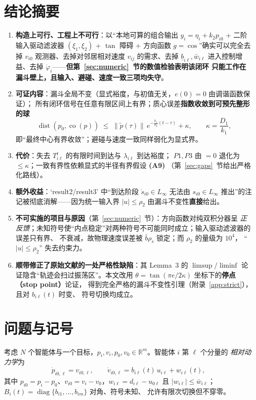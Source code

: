 \documentclass[11pt,a4paper]{article}
\newcommand{\ub}{\underline{b}}
\newcommand{\dist}{\operatorname{dist}}
\newcommand{\co}{\operatorname{co}}
\newcommand{\diag}{\operatorname{diag}}
\theoremstyle{plain}
\theoremstyle{definition}
\theoremstyle{remark}
\begin{document}
\section{结论摘要}
\begin{enumerate}[label=\textbf{\arabic*.}]
\item \textbf{构造上可行、工程上不可行}：以“本地可算的组合输出 $y_i=\eta_i+k_2p_{i0}$ +
二阶输入驱动滤波器 $(\xi_1,\xi_2)$ + $\tan$ 障碍 + 方向函数 $g=\cos$”确实可以完全去掉
$v_{i0}$ 观测器、去掉对邻居相对速度 $v_{ij}$ 的需求、去掉 $\ub_{i\ell},\bar w_{i\ell}$
进入控制增益、去掉 $\dot\varphi_i$——\textbf{但第~\ref{sec:numeric}~节的数值检验表明该闭环
只能工作在漏斗壁上，且输入、避碰、速度一致三项均失守}。
\item \textbf{可证内容}：漏斗全局不变（显式裕度，与初值无关，$e(0)=0$ 由调谐函数保证）；
所有闭环信号在任意有限区间上有界；质心误差\textbf{指数收敛到可预先整形的球}
\begin{equation*}
\dist(p_0,\co(p))\;\le\;\|\tilde p(\tau)\|\,e^{-\frac{k_1}{k_2}(t-\tau)}+\kappa,
\qquad \kappa=\frac{D_1}{k_1},
\end{equation*}
即“最终中心有界收敛”；避碰与速度一致同样弱化为显式界。
\item \textbf{代价}：失去 $T^{\mathrm r}_{i\ell}$ 的有限时间到达与 $\lambda_{i\ell}$ 到达裕度；
$P1,P3$ 由 $=0$ 退化为 $\le\kappa$；一致有界性依赖显式的半径有界假设 \textbf{(A9)}
（第~\ref{sec:gaps}~节给出严格化路线）。
\item \textbf{额外收益}：`result2/result3' 中“到达阶段 $\dot s_{i0}\in L_\infty$ 无法由
$s_{i0}\in L_\infty$ 推出”的注记被彻底消解——因为统一输入界
$|u|\le\rho_2$ 由漏斗不变性\textbf{直接}给出。
\item \textbf{不可实施的项目与原因}（第~\ref{sec:numeric}~节）：方向函数对纯双积分器呈
\emph{正反馈}；未知符号使“内点稳定”对两种符号不可能同时成立；输入驱动滤波器的误差只有界、
不衰减，故物理速度误差被 $\bar b\rho_s$ 锁定；而 $\rho_2$ 的量级为 $10^4$，
“$|u|\le\rho_2$” 失去约束力。
\item \textbf{顺带修正了原始文献的一处严格性缺陷}：其 Lemma~3 的
$\limsup/\liminf$ 论证隐含“轨迹会扫过振荡区”。本文改用
$\theta=\tan(\pi e/2\kappa)$ 坐标下的\textbf{停点（stop point）}论证，
得到完全严格的漏斗不变性引理（附录~\ref{app:strict}），且对 $b_{i\ell}(t)$ 时变、
符号切换均成立。
\end{enumerate}

\section{问题与记号}
考虑 $N$ 个智能体与一个目标，$p_i,v_i,p_0,v_0\in\mathbb R^m$。智能体 $i$ 第 $\ell$ 个分量的
\emph{相对动力学}为
\begin{equation}
\dot p_{i0,\ell}=v_{i0,\ell},\qquad
\dot v_{i0,\ell}=b_{i\ell}(t)\,u_{i\ell}+w_{i\ell}(t),
\tag{1.1}
\end{equation}
其中 $p_{i0}=p_i-p_0$、$v_{i0}=v_i-v_0$，$w_{i\ell}=d_{i\ell}-u_{0\ell}$ 且
$|w_{i\ell}|\le\bar w_{i\ell}$；$B_i(t)=\diag\{b_{i1},\dots,b_{im}\}$ 对角、符号未知、
允许有限次切换但不穿零。
\end{document}

